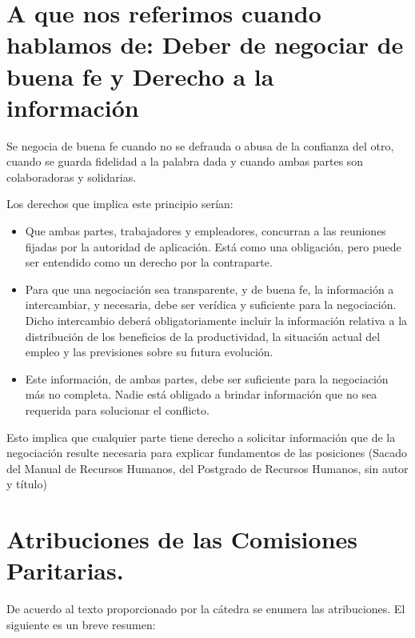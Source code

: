 \documentclass[a4paper, 12pt]{article}
\begin{document}
\section{A que nos referimos cuando hablamos de:  Deber de negociar de buena fe y Derecho a la información}

Se negocia de buena fe cuando no se defrauda o abusa de la confianza del otro, cuando se guarda fidelidad a la palabra dada y cuando ambas partes son colaboradoras y solidarias. 

Los derechos que implica este principio serían: 
\begin{itemize}
\item Que ambas partes, trabajadores y empleadores, concurran a las reuniones fijadas por la autoridad de aplicación. Está como una obligación, pero puede ser entendido como un derecho por la contraparte.
\item Para que una negociación sea transparente, y de buena fe, la información a intercambiar, y necesaria, debe ser verídica y suficiente para la negociación. Dicho intercambio deberá obligatoriamente incluir la información relativa a la distribución de los beneficios de la productividad, la situación actual del empleo y las previsiones sobre su futura evolución.
\item Este información, de ambas partes, debe ser suficiente para la negociación más no completa. Nadie está obligado a brindar información que no sea requerida para solucionar el conflicto.
\end{itemize}

Esto implica que cualquier parte tiene derecho a solicitar información que de la negociación resulte necesaria para explicar fundamentos de las posiciones (Sacado del Manual de Recursos Humanos, del Postgrado de Recursos Humanos, sin autor y título)

\section{Atribuciones de las Comisiones Paritarias.}
De acuerdo al texto proporcionado por la cátedra se enumera las atribuciones. El siguiente es un breve resumen:
\end{document}
